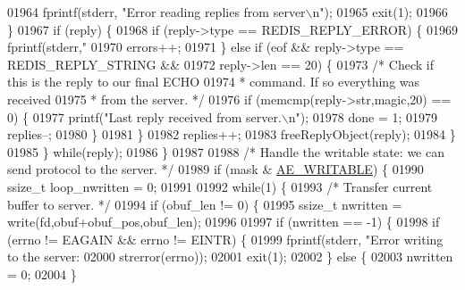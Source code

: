 \begin{DoxyCode}
{{{{{{{{{{{{{{{{{{{{{{{{{{{{{{{{{{{{{{{{{{{{{{{{{{{{{{01964                     fprintf(stderr, \textcolor{stringliteral}{"Error reading replies from server\(\backslash\)n"});
01965                     exit(1);
01966                 \}
01967                 \textcolor{keywordflow}{if} (reply) \{
01968                     \textcolor{keywordflow}{if} (reply->type == REDIS\_REPLY\_ERROR) \{
01969                         fprintf(stderr,\textcolor{stringliteral}{"%
01970                         errors++;
01971                     \} \textcolor{keywordflow}{else} \textcolor{keywordflow}{if} (eof && reply->type == REDIS\_REPLY\_STRING &&
01972                                       reply->len == 20) \{
01973                         \textcolor{comment}{/* Check if this is the reply to our final ECHO}
01974 \textcolor{comment}{                         * command. If so everything was received}
01975 \textcolor{comment}{                         * from the server. */}
01976                         \textcolor{keywordflow}{if} (memcmp(reply->str,magic,20) == 0) \{
01977                             printf(\textcolor{stringliteral}{"Last reply received from server.\(\backslash\)n"});
01978                             done = 1;
01979                             replies--;
01980                         \}
01981                     \}
01982                     replies++;
01983                     freeReplyObject(reply);
01984                 \}
01985             \} \textcolor{keywordflow}{while}(reply);
01986         \}
01987 
01988         \textcolor{comment}{/* Handle the writable state: we can send protocol to the server. */}
01989         \textcolor{keywordflow}{if} (mask & \hyperlink{ae_8h_ab6bfb0366ccb6277112d132c2a2bf500}{AE\_WRITABLE}) \{
01990             ssize\_t loop\_nwritten = 0;
01991 
01992             \textcolor{keywordflow}{while}(1) \{
01993                 \textcolor{comment}{/* Transfer current buffer to server. */}
01994                 \textcolor{keywordflow}{if} (obuf\_len != 0) \{
01995                     ssize\_t nwritten = write(fd,obuf+obuf\_pos,obuf\_len);
01996 
01997                     \textcolor{keywordflow}{if} (nwritten == -1) \{
01998                         \textcolor{keywordflow}{if} (errno != EAGAIN && errno != EINTR) \{
01999                             fprintf(stderr, \textcolor{stringliteral}{"Error writing to the server: %
02000                                 strerror(errno));
02001                             exit(1);
02002                         \} \textcolor{keywordflow}{else} \{
02003                             nwritten = 0;
02004                         \}
}}}}}}}}}}}}}}}}}}}}}}}}}}}}}}}}}}}}}}}}}}}}}}}}}}}}}}}}
\end{DoxyCode}

